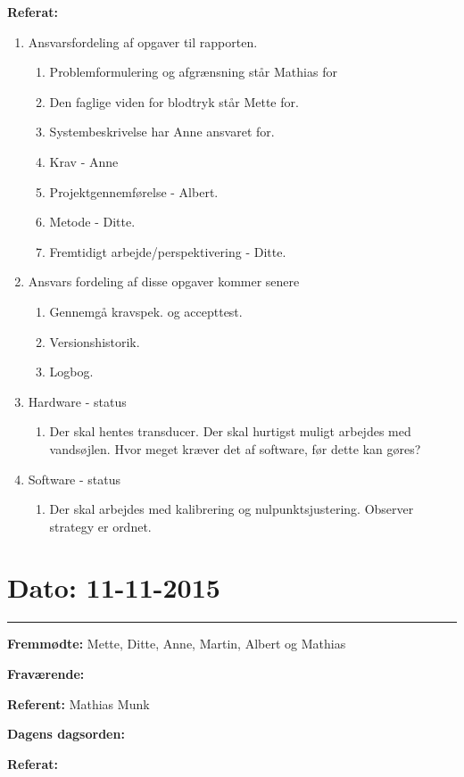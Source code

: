 \textbf{Referat:}
\newline 
\begin{enumerate}
\item Ansvarsfordeling af opgaver til rapporten.
\begin{enumerate}
\item Problemformulering og afgrænsning står Mathias for
\item Den faglige viden for blodtryk står Mette for.
\item Systembeskrivelse har Anne ansvaret for.
\item Krav - Anne
\item Projektgennemførelse - Albert.
\item Metode - Ditte.
\item Fremtidigt arbejde/perspektivering - Ditte.
\end{enumerate}
\item Ansvars fordeling af disse opgaver kommer senere
\begin{enumerate}
\item Gennemgå kravspek. og accepttest.
\item Versionshistorik.
\item Logbog.
\end{enumerate}
\item Hardware - status
\begin{enumerate}
\item Der skal hentes transducer. Der skal hurtigst muligt arbejdes med vandsøjlen. Hvor meget kræver det af software, før dette kan gøres?
\end{enumerate}
\item Software - status
\begin{enumerate}
\item Der skal arbejdes med kalibrering  og nulpunktsjustering. Observer strategy er ordnet.
\end{enumerate}
\end{enumerate}

\section{Dato: 11-11-2015}
\hrule

\textbf{Fremmødte:} Mette, Ditte, Anne, Martin, Albert og Mathias 

\textbf{Fraværende:}

\textbf{Referent:} Mathias Munk

\textbf{Dagens dagsorden:}

\textbf{Referat:}
\newline 
